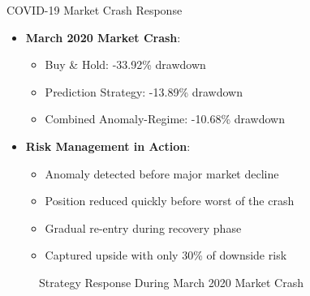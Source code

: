 \documentclass[aspectratio=169,xcolor=dvipsnames]{beamer}
\begin{document}
\begin{frame}{COVID-19 Market Crash Response}
    \begin{itemize}
        \item \textbf{March 2020 Market Crash}:
              \begin{itemize}
                  \item Buy \& Hold: -33.92\% drawdown
                  \item Prediction Strategy: -13.89\% drawdown
                  \item Combined Anomaly-Regime: -10.68\% drawdown
              \end{itemize}
        \item \textbf{Risk Management in Action}:
              \begin{itemize}
                  \item Anomaly detected before major market decline
                  \item Position reduced quickly before worst of the crash
                  \item Gradual re-entry during recovery phase
                  \item Captured upside with only 30\% of downside risk
              \end{itemize}
    \end{itemize}
    
    \begin{figure}
        \centering
        \caption{Strategy Response During March 2020 Market Crash}
    \end{figure}
\end{frame}
\end{document}
